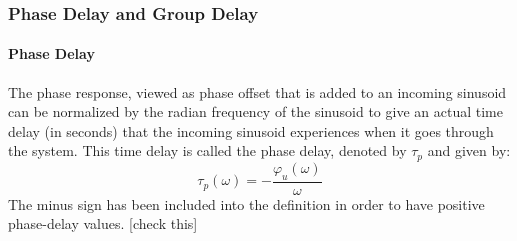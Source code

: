 %



\subsubsection{Phase Delay and Group Delay} 
\paragraph{Phase Delay}
The phase response, viewed as phase offset that is added to an incoming sinusoid can be normalized by the radian frequency of the sinusoid to give an actual time delay (in seconds) that the incoming sinusoid experiences when it goes through the system. This time delay is called the phase delay, denoted by $\tau_p$ and given by:
\begin{equation}
 \tau_p (\omega) = -\frac{\varphi_u(\omega)}{\omega}
\end{equation} 
The minus sign has been included into the definition in order to have positive phase-delay values. [check this]



